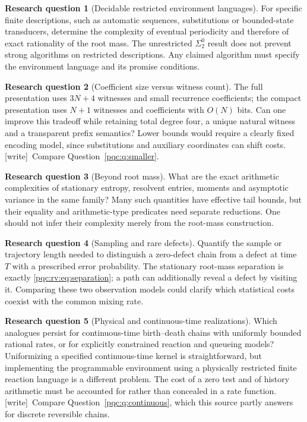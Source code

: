 \documentclass[11pt,letterpaper]{article}
\numberwithin{equation}{section}
\theoremstyle{definition}
\newtheorem{question}{Research question}
\theoremstyle{remark}
\newcommand{\wtag}{\textup{[write]}}
\begin{document}
\begin{question}[Decidable restricted environment languages]
For specific finite descriptions, such as automatic sequences,
substitutions or bounded-state transducers, determine the complexity
of eventual periodicity and therefore of exact rationality of the
root mass. The unrestricted $\Sigma^0_2$ result does not prevent
strong algorithms on restricted descriptions. Any claimed algorithm
must specify the environment language and its promise conditions.
\end{question}

\begin{question}[Coefficient size versus witness count]
The full presentation uses $3N+4$ witnesses and small recurrence
coefficients; the compact presentation uses $N+1$ witnesses and
coefficients with $O(N)$ bits. Can one improve this tradeoff while
retaining total degree four, a unique natural witness and a transparent
prefix semantics? Lower bounds would require a clearly fixed encoding
model, since substitutions and auxiliary coordinates can shift costs.
\wtag\ Compare Question~\ref{pqc:q:smaller}.
\end{question}

\begin{question}[Beyond root mass]
What are the exact arithmetic complexities of stationary entropy,
resolvent entries, moments and asymptotic variance in the same family?
Many such quantities have effective tail bounds, but their equality
and arithmetic-type predicates need separate reductions. One should
not infer their complexity merely from the root-mass construction.
\end{question}

\begin{question}[Sampling and rare defects]
Quantify the sample or trajectory length needed to distinguish a
zero-defect chain from a defect at time $T$ with a prescribed error
probability. The stationary root-mass separation is exactly
\cref{pqc:rv:eq:separation}; a path can additionally reveal a defect by
visiting it. Comparing these two observation models could clarify
which statistical costs coexist with the common mixing rate.
\end{question}

\begin{question}[Physical and continuous-time realizations]\label{pqc:rv:q:physical}
Which analogues persist for continuous-time birth--death chains with
uniformly bounded rational rates, or for explicitly constrained
reaction and queueing models? Uniformizing a specified continuous-time
kernel is straightforward, but implementing the programmable environment
using a physically restricted finite reaction language is a different
problem. The cost of a zero test and of history arithmetic must be
accounted for rather than concealed in a rate function.
\wtag\ Compare Question~\ref{pqc:q:continuous}, which this source partly answers for discrete reversible chains.
\end{question}
\end{document}

